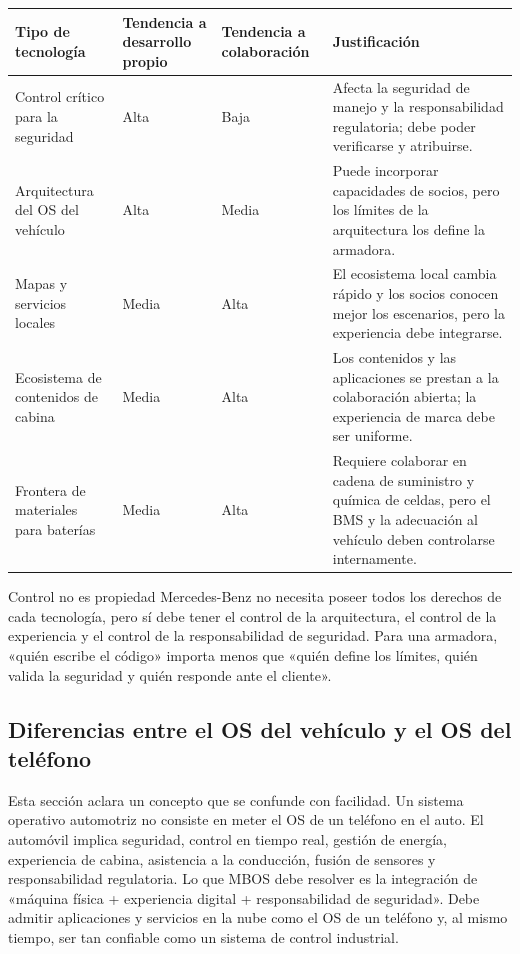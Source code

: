 \noindent\begin{tabularx}{\textwidth}{p{}p{}p{}X}
\toprule
Tipo de tecnología & Tendencia a desarrollo propio & Tendencia a colaboración & Justificación \\
\midrule
Control crítico para la seguridad & Alta & Baja & Afecta la seguridad de manejo y la responsabilidad regulatoria; debe poder verificarse y atribuirse. \\
Arquitectura del OS del vehículo & Alta & Media & Puede incorporar capacidades de socios, pero los límites de la arquitectura los define la armadora. \\
Mapas y servicios locales & Media & Alta & El ecosistema local cambia rápido y los socios conocen mejor los escenarios, pero la experiencia debe integrarse. \\
Ecosistema de contenidos de cabina & Media & Alta & Los contenidos y las aplicaciones se prestan a la colaboración abierta; la experiencia de marca debe ser uniforme. \\
Frontera de materiales para baterías & Media & Alta & Requiere colaborar en cadena de suministro y química de celdas, pero el BMS y la adecuación al vehículo deben controlarse internamente. \\
\bottomrule
\end{tabularx}

\begin{importantbox}{Control no es propiedad}
Mercedes-Benz no necesita poseer todos los derechos de cada tecnología, pero sí debe tener el control de la arquitectura, el control de la experiencia y el control de la responsabilidad de seguridad. Para una armadora, «quién escribe el código» importa menos que «quién define los límites, quién valida la seguridad y quién responde ante el cliente».
\end{importantbox}

\subsection{Diferencias entre el OS del vehículo y el OS del teléfono}

Esta sección aclara un concepto que se confunde con facilidad. Un sistema operativo automotriz no consiste en meter el OS de un teléfono en el auto. El automóvil implica seguridad, control en tiempo real, gestión de energía, experiencia de cabina, asistencia a la conducción, fusión de sensores y responsabilidad regulatoria. Lo que MBOS debe resolver es la integración de «máquina física + experiencia digital + responsabilidad de seguridad». Debe admitir aplicaciones y servicios en la nube como el OS de un teléfono y, al mismo tiempo, ser tan confiable como un sistema de control industrial.

